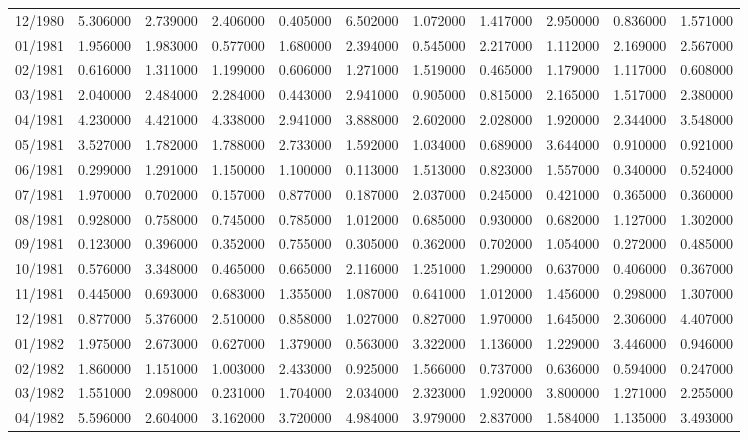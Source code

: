 \begin{tabular}{lrrrrrrrrrr}
12/1980 & 5.306000 & 2.739000 & 2.406000 & 0.405000 & 6.502000 & 1.072000 & 1.417000 & 2.950000 & 0.836000 & 1.571000 \\
01/1981 & 1.956000 & 1.983000 & 0.577000 & 1.680000 & 2.394000 & 0.545000 & 2.217000 & 1.112000 & 2.169000 & 2.567000 \\
02/1981 & 0.616000 & 1.311000 & 1.199000 & 0.606000 & 1.271000 & 1.519000 & 0.465000 & 1.179000 & 1.117000 & 0.608000 \\
03/1981 & 2.040000 & 2.484000 & 2.284000 & 0.443000 & 2.941000 & 0.905000 & 0.815000 & 2.165000 & 1.517000 & 2.380000 \\
04/1981 & 4.230000 & 4.421000 & 4.338000 & 2.941000 & 3.888000 & 2.602000 & 2.028000 & 1.920000 & 2.344000 & 3.548000 \\
05/1981 & 3.527000 & 1.782000 & 1.788000 & 2.733000 & 1.592000 & 1.034000 & 0.689000 & 3.644000 & 0.910000 & 0.921000 \\
06/1981 & 0.299000 & 1.291000 & 1.150000 & 1.100000 & 0.113000 & 1.513000 & 0.823000 & 1.557000 & 0.340000 & 0.524000 \\
07/1981 & 1.970000 & 0.702000 & 0.157000 & 0.877000 & 0.187000 & 2.037000 & 0.245000 & 0.421000 & 0.365000 & 0.360000 \\
08/1981 & 0.928000 & 0.758000 & 0.745000 & 0.785000 & 1.012000 & 0.685000 & 0.930000 & 0.682000 & 1.127000 & 1.302000 \\
09/1981 & 0.123000 & 0.396000 & 0.352000 & 0.755000 & 0.305000 & 0.362000 & 0.702000 & 1.054000 & 0.272000 & 0.485000 \\
10/1981 & 0.576000 & 3.348000 & 0.465000 & 0.665000 & 2.116000 & 1.251000 & 1.290000 & 0.637000 & 0.406000 & 0.367000 \\
11/1981 & 0.445000 & 0.693000 & 0.683000 & 1.355000 & 1.087000 & 0.641000 & 1.012000 & 1.456000 & 0.298000 & 1.307000 \\
12/1981 & 0.877000 & 5.376000 & 2.510000 & 0.858000 & 1.027000 & 0.827000 & 1.970000 & 1.645000 & 2.306000 & 4.407000 \\
01/1982 & 1.975000 & 2.673000 & 0.627000 & 1.379000 & 0.563000 & 3.322000 & 1.136000 & 1.229000 & 3.446000 & 0.946000 \\
02/1982 & 1.860000 & 1.151000 & 1.003000 & 2.433000 & 0.925000 & 1.566000 & 0.737000 & 0.636000 & 0.594000 & 0.247000 \\
03/1982 & 1.551000 & 2.098000 & 0.231000 & 1.704000 & 2.034000 & 2.323000 & 1.920000 & 3.800000 & 1.271000 & 2.255000 \\
04/1982 & 5.596000 & 2.604000 & 3.162000 & 3.720000 & 4.984000 & 3.979000 & 2.837000 & 1.584000 & 1.135000 & 3.493000 \\

\end{tabular}

